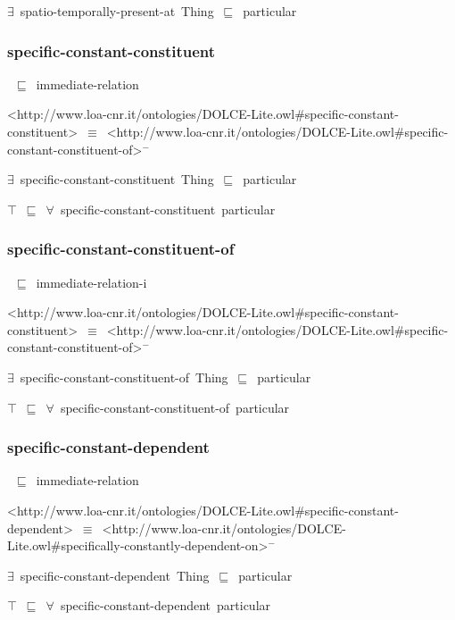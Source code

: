 \documentclass{article}
\begin{document}
\ensuremath{\exists}~spatio-temporally-present-at~Thing~\ensuremath{\sqsubseteq}~particular

\subsubsection*{specific-constant-constituent}

~\ensuremath{\sqsubseteq}~immediate-relation

<http://www.loa-cnr.it/ontologies/DOLCE-Lite.owl#specific-constant-constituent>~\ensuremath{\equiv}~<http://www.loa-cnr.it/ontologies/DOLCE-Lite.owl#specific-constant-constituent-of>\ensuremath{^-}

\ensuremath{\exists}~specific-constant-constituent~Thing~\ensuremath{\sqsubseteq}~particular

\ensuremath{\top}~\ensuremath{\sqsubseteq}~\ensuremath{\forall}~specific-constant-constituent~particular

\subsubsection*{specific-constant-constituent-of}

~\ensuremath{\sqsubseteq}~immediate-relation-i

<http://www.loa-cnr.it/ontologies/DOLCE-Lite.owl#specific-constant-constituent>~\ensuremath{\equiv}~<http://www.loa-cnr.it/ontologies/DOLCE-Lite.owl#specific-constant-constituent-of>\ensuremath{^-}

\ensuremath{\exists}~specific-constant-constituent-of~Thing~\ensuremath{\sqsubseteq}~particular

\ensuremath{\top}~\ensuremath{\sqsubseteq}~\ensuremath{\forall}~specific-constant-constituent-of~particular

\subsubsection*{specific-constant-dependent}

~\ensuremath{\sqsubseteq}~immediate-relation

<http://www.loa-cnr.it/ontologies/DOLCE-Lite.owl#specific-constant-dependent>~\ensuremath{\equiv}~<http://www.loa-cnr.it/ontologies/DOLCE-Lite.owl#specifically-constantly-dependent-on>\ensuremath{^-}

\ensuremath{\exists}~specific-constant-dependent~Thing~\ensuremath{\sqsubseteq}~particular

\ensuremath{\top}~\ensuremath{\sqsubseteq}~\ensuremath{\forall}~specific-constant-dependent~particular
\end{document}

